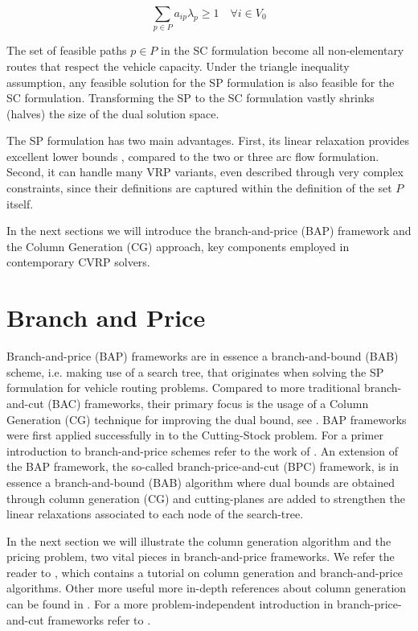 \begin{equation}\label{eq:set-covering-customers-visited-by-exactly-one-route}
	\sum_{p \in P}  a_{ip} \lambda_p \ge 1  \quad \forall i \in V_0
\end{equation}

The set of feasible paths $p \in P$ in the SC formulation
become all non-elementary routes that respect the vehicle capacity.
Under the triangle inequality assumption,
any feasible solution for the SP formulation is also feasible for the SC formulation.
Transforming the SP to the SC formulation vastly shrinks (halves) the size of the dual solution space.

\medskip


The SP formulation has two main advantages.
First, its linear relaxation provides excellent lower bounds \parencite{bramel1997},
compared to the two or three arc flow formulation.
Second, it can handle many VRP variants,
even described through very complex constraints,
since their definitions are captured within the definition of the set $P$ itself.


\medskip

In the next sections we will introduce
the branch-and-price (BAP) framework and the Column Generation (CG) approach,
key components employed in contemporary CVRP solvers.


\section{Branch and Price}
\label{sec:intro-branch-and-price}

Branch-and-price (BAP) frameworks are in essence a branch-and-bound (BAB) scheme,
i.e. making use of a search tree,
that originates when solving the SP formulation for vehicle routing problems.
Compared to more traditional branch-and-cut (BAC) frameworks,
their primary focus is the usage of a Column Generation (CG) technique for improving the dual bound,
see \textcite{righini2008}.
BAP frameworks were first applied successfully in \textcite{gilmore1961} to the Cutting-Stock problem.
For a primer introduction to branch-and-price schemes refer to the work of \textcite{barnhart1998}.
An extension of the BAP framework, the so-called branch-price-and-cut (BPC) framework,
is in essence a branch-and-bound (BAB) algorithm where dual bounds are obtained through column generation (CG)
and cutting-planes are added to strengthen the linear relaxations associated to each node of the search-tree.

In the next section we will illustrate the column generation algorithm
and the pricing problem, two vital pieces in branch-and-price frameworks.
We refer the reader to \textcite{feillet2010}, which contains a tutorial
on column generation and branch-and-price algorithms.
Other more useful more in-depth references about column generation can be found in \textcite{desrosiers2005, lubbecke2005}.
For a more problem-independent introduction in branch-price-and-cut frameworks refer to \textcite{desrosiers2011}.


